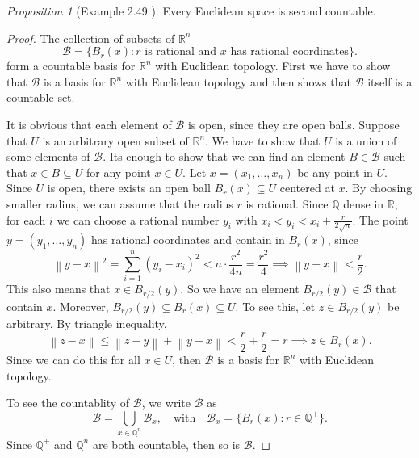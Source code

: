 \documentclass[a4paper]{article}
\theoremstyle{remark}
\newtheorem{prop}{Proposition}
\newcommand{\rn}{\mathbb{R}^n} %
\newcommand{\subhim}{\subseteq} %
\newcommand\norm[1]{\left\lVert#1\right\rVert} %
\begin{document}
\begin{prop}[Example 2.49 \cite{LeeTM}]
Every Euclidean space is second countable.
\end{prop}
\begin{proof}
The collection of subsets of $\rn$
$$
\mathcal{B}  = \{ B_r(x) : r \text{ is rational and }x \text{ has rational coordinates}  \}.
$$
form a countable basis for $\rn$ with Euclidean topology. First we have to show that $\mathcal{B}$ is a basis for $\rn$ with Euclidean topology and then shows that $\mathcal{B}$ itself is a countable set. 

It is obvious that each element of $\mathcal{B}$ is open, since they are open balls. Suppose that $U$ is an arbitrary open subset of $\rn$. We have to show that $U$ is a union of some elements of $\mathcal{B}$. Its enough to show that we can find an element $B \in \mathcal{B}$ such that $x \in B \subhim U$ for any point $x \in U$. Let $x=(x_1,\dots,x_n)$ be any point in $U$. Since $U$ is open, there exists an open ball $B_r(x) \subhim U$ centered at $x$. By choosing smaller radius, we can assume that the radius $r$ is rational. Since $\mathbb{Q}$ dense in $\mathbb{R}$, for each $i$ we can choose a rational number $y_i$ with $x_i < y_i < x_i+ \frac{r}{2\sqrt{n}}$. The point $y = (y_1,\dots,y_n)$ has rational coordinates and contain in $B_r(x)$, since
$$
\norm{y-x}^2 = \sum_{i=1}^{n} (y_i-x_i)^2 < n\cdot \frac{r^2}{4n} = \frac{r^2}{4} \implies \norm{y-x} <\frac{r}{2}.
$$
This also means that $x \in B_{r/2}(y)$. So we have an element $B_{r/2}(y) \in \mathcal{B}$ that contain $x$. Moreover, $B_{r/2}(y) \subhim B_{r}(x) \subhim U$. To see this, let $z \in B_{r/2}(y)$ be arbitrary. By triangle inequality,
$$
\norm{z-x} \leq \norm{z-y} + \norm{y-x} < \frac{r}{2} + \frac{r}{2} = r \implies z \in B_r(x).
$$ 
Since we can do this for all $x \in U$, then $\mathcal{B}$ is a basis for $\rn$ with Euclidean topology. 

To see the countablity of $\mathcal{B}$, we write $\mathcal{B}$ as 
$$
\mathcal{B} = \bigcup_{x \in \mathbb{Q}^n} \mathcal{B}_x, \quad  \text{with} \quad \mathcal{B}_x = \{ B_{r}(x) : r \in \mathbb{Q}^{+} \}.
$$
Since $\mathbb{Q}^{+}$ and $\mathbb{Q}^n$ are both countable, then so is $\mathcal{B}$. 
\end{proof}
\end{document}
